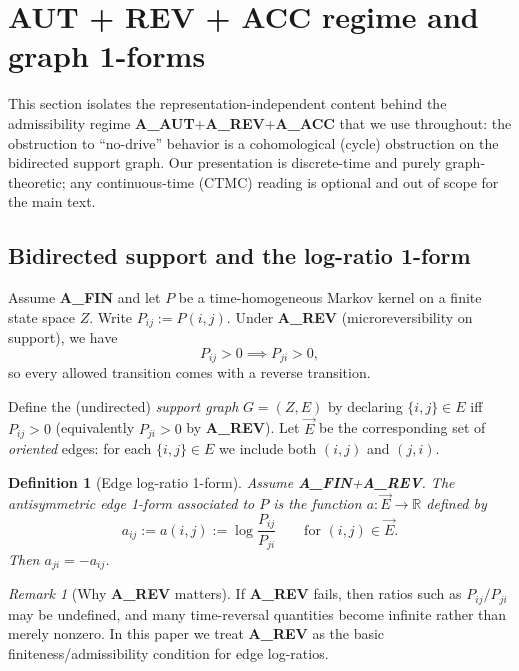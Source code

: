 \documentclass[11pt]{article}
\newtheorem{definition}{Definition}
\theoremstyle{remark}
\newtheorem{remark}{Remark}
\begin{document}
\section{AUT + REV + ACC regime and graph 1-forms}
\label{sec:acc}

This section isolates the representation-independent content behind the admissibility regime
\textbf{A\_AUT}+\textbf{A\_REV}+\textbf{A\_ACC} that we use throughout: the obstruction to
``no-drive'' behavior is a cohomological (cycle) obstruction on the bidirected support graph.
Our presentation is discrete-time and purely graph-theoretic; any continuous-time (CTMC) reading
is optional and out of scope for the main text.

\subsection{Bidirected support and the log-ratio 1-form}

Assume \textbf{A\_FIN} and let $P$ be a time-homogeneous Markov kernel on a finite state space $Z$.
Write $P_{ij}:=P(i,j)$.
Under \textbf{A\_REV} (microreversibility on support), we have
\[
P_{ij}>0 \implies P_{ji}>0,
\]
so every allowed transition comes with a reverse transition.

Define the (undirected) \emph{support graph} $G=(Z,E)$ by declaring $\{i,j\}\in E$ iff $P_{ij}>0$
(equivalently $P_{ji}>0$ by \textbf{A\_REV}). Let $\vec E$ be the corresponding set of
\emph{oriented} edges: for each $\{i,j\}\in E$ we include both $(i,j)$ and $(j,i)$.

\begin{definition}[Edge log-ratio 1-form]
\label{def:edge-one-form}
Assume \textbf{A\_FIN}+\textbf{A\_REV}. The \emph{antisymmetric edge 1-form} associated to $P$ is
the function $a:\vec E\to \mathbb R$ defined by
\[
a_{ij} := a(i,j) := \log\frac{P_{ij}}{P_{ji}} \qquad \text{for } (i,j)\in \vec E.
\]
Then $a_{ji}=-a_{ij}$.
\end{definition}

\begin{remark}[Why \textbf{A\_REV} matters]
If \textbf{A\_REV} fails, then ratios such as $P_{ij}/P_{ji}$ may be undefined, and many
time-reversal quantities become infinite rather than merely nonzero. In this paper we treat
\textbf{A\_REV} as the basic finiteness/admissibility condition for edge log-ratios.
\end{remark}
\end{document}
